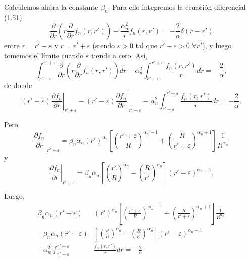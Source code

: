 \documentclass[12pt,a4paper]{book}
\begin{document}
Calculemos ahora la constante $\beta_n$. Para ello integremos la ecuación diferencial (1.51)
\begin{equation}
\frac{\partial}{\partial r}\left(r \frac{\partial}{\partial r}f_n(r, r')\right) - \frac{\alpha_n^2}{r}f_n(r, r') = -\frac{2}{\alpha}\delta(r - r')
\end{equation}
entre $r = r' - \varepsilon$ y $r = r' + \varepsilon$ (siendo $\varepsilon > 0$ tal que $r' - \varepsilon > 0$ $\forall r'$), y luego tomemos el límite cuando $\varepsilon$ tiende a cero. Así,
\begin{equation}
\int_{r'-\varepsilon}^{r'+\varepsilon} \frac{\partial}{\partial r}\left(r \frac{\partial}{\partial r}f_n(r, r')\right) dr - \alpha_n^2 \int_{r'-\varepsilon}^{r'+\varepsilon} \frac{f_n(r, r')}{r} dr = -\frac{2}{\alpha},
\end{equation}
de donde
\begin{equation}
(r' + \varepsilon)\left.\frac{\partial f_n}{\partial r}\right|_{r'+\varepsilon} - (r' - \varepsilon)\left.\frac{\partial f_n}{\partial r}\right|_{r'-\varepsilon} - \alpha_n^2 \int_{r'-\varepsilon}^{r'+\varepsilon} \frac{f_n(r, r')}{r} dr = -\frac{2}{\alpha}.
\end{equation}

Pero
\begin{equation}
\left.\frac{\partial f_n}{\partial r}\right|_{r'+\varepsilon} = \beta_n \alpha_n (r')^{\alpha_n} \left[\left(\frac{r'+\varepsilon}{R}\right)^{\alpha_n-1} + \left(\frac{R}{r'+\varepsilon}\right)^{\alpha_n+1}\right] \frac{1}{R^{\alpha_n}}
\end{equation}
y
\begin{equation}
\left.\frac{\partial f_n}{\partial r}\right|_{r'-\varepsilon} = \beta_n \alpha_n \left[\left(\frac{r'}{R}\right)^{\alpha_n} - \left(\frac{R}{r'}\right)^{\alpha_n}\right](r'-\varepsilon)^{\alpha_n-1}.
\end{equation}

Luego,
\begin{equation}
\begin{split}
\beta_n \alpha_n (r'+\varepsilon) & (r')^{\alpha_n} \left[\left(\frac{r'+\varepsilon}{R}\right)^{\alpha_n-1} + \left(\frac{R}{r'+\varepsilon}\right)^{\alpha_n+1}\right] \frac{1}{R^{\alpha_n}}\\
- \beta_n \alpha_n (r'-\varepsilon) & \left[\left(\frac{r'}{R}\right)^{\alpha_n} - \left(\frac{R}{r'}\right)^{\alpha_n}\right](r'-\varepsilon)^{\alpha_n-1}\\
- \alpha_n^2 \int_{r'-\varepsilon}^{r'+\varepsilon} & \frac{f_n(r, r')}{r} dr = -\frac{2}{\alpha}
\end{split}
\end{equation}
\end{document}
